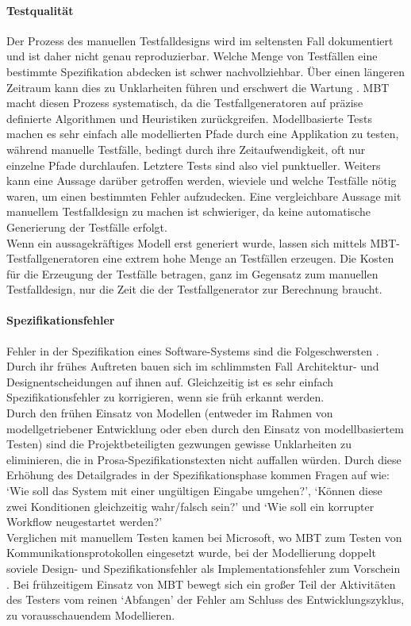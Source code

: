 \paragraph{Testqualität} Der Prozess des manuellen Testfalldesigns wird im seltensten Fall dokumentiert und ist daher nicht genau reproduzierbar. Welche Menge von Testfällen eine bestimmte Spezifikation abdecken ist schwer nachvollziehbar. Über einen längeren Zeitraum kann dies zu Unklarheiten führen und erschwert die Wartung \cite{utting_practical_2007}. \Gls{MBT} macht diesen Prozess systematisch, da die Testfallgeneratoren auf präzise definierte Algorithmen und Heuristiken zurückgreifen. Modellbasierte Tests machen es sehr einfach alle modellierten Pfade durch eine Applikation zu testen, während manuelle Testfälle, bedingt durch ihre Zeitaufwendigkeit, oft nur einzelne Pfade durchlaufen. Letztere Tests sind also viel punktueller. Weiters kann eine Aussage darüber getroffen werden, wieviele und welche Testfälle nötig waren, um einen bestimmten Fehler aufzudecken. Eine vergleichbare Aussage mit manuellem Testfalldesign zu machen ist schwieriger, da keine automatische Generierung der Testfälle erfolgt.\\
Wenn ein aussagekräftiges Modell erst generiert wurde, lassen sich mittels MBT-Testfallgeneratoren eine extrem hohe Menge an Testfällen erzeugen. Die Kosten für die Erzeugung der Testfälle betragen, ganz im Gegensatz zum manuellen Testfalldesign, nur die Zeit die der Testfallgenerator zur Berechnung braucht.

\paragraph{Spezifikationsfehler}
Fehler in der Spezifikation eines Software-Systems sind die Folgeschwersten \cite{utting_practical_2007}. Durch ihr frühes Auftreten bauen sich im schlimmsten Fall Architektur- und Designentscheidungen auf ihnen auf. Gleichzeitig ist es sehr einfach Spezifikationsfehler zu korrigieren, wenn sie früh erkannt werden.\\
Durch den frühen Einsatz von Modellen (entweder im Rahmen von modellgetriebener Entwicklung oder eben durch den Einsatz von modellbasiertem Testen) sind die Projektbeteiligten gezwungen gewisse Unklarheiten zu eliminieren, die in Prosa-Spezifikationstexten nicht auffallen würden. Durch diese Erhöhung des Detailgrades in der Spezifikationsphase kommen Fragen auf wie: `Wie soll das System mit einer ungültigen Eingabe umgehen?', `Können diese zwei Konditionen gleichzeitig wahr/falsch sein?' und `Wie soll ein korrupter Workflow neugestartet werden?'\\
Verglichen mit manuellem Testen kamen bei Microsoft, wo \Gls{MBT} zum Testen von Kommunikationsprotokollen eingesetzt wurde,  bei der Modellierung doppelt soviele Design- und Spezifikationsfehler als Implementationsfehler zum Vorschein \cite{stobie_model_2005}. Bei frühzeitigem Einsatz von MBT bewegt sich ein großer Teil der Aktivitäten des Testers vom reinen `Abfangen' der Fehler am Schluss des Entwicklungszyklus, zu vorausschauendem Modellieren.

